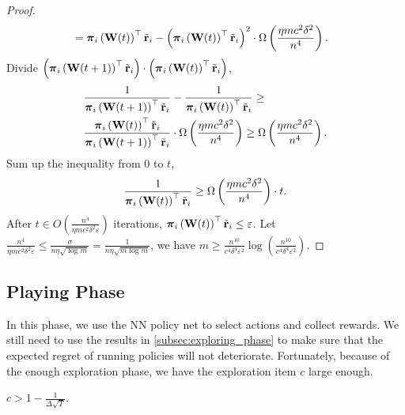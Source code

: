 \begin{proof}
\begin{equation*}
\begin{split}
    &= {\boldsymbol{\pi}}_i\left( {\mathbf{W}}(t) \right)^\top {\tilde{\mathbf{r}}}_i - \left( {\boldsymbol{\pi}}_i\left( {\mathbf{W}}(t) \right)^\top {\tilde{\mathbf{r}}}_i \right)^2 \cdot \Omega\left( \frac{\eta m c^2 \delta^2}{n^4} \right).
\end{split}
\end{equation*}
Divide $\left( {\boldsymbol{\pi}}_i\left( {\mathbf{W}}(t+1) \right)^\top {\tilde{\mathbf{r}}}_i\right) \cdot \left( {\boldsymbol{\pi}}_i\left( {\mathbf{W}}(t) \right)^\top {\tilde{\mathbf{r}}}_i \right)$,
\begin{equation*}
\begin{split}
    &\frac{1}{{\boldsymbol{\pi}}_i\left( {\mathbf{W}}(t+1) \right)^\top {\tilde{\mathbf{r}}}_i} - \frac{1}{{\boldsymbol{\pi}}_i\left( {\mathbf{W}}(t) \right)^\top {\tilde{\mathbf{r}}}_i} \ge \\
    &\frac{{\boldsymbol{\pi}}_i\left( {\mathbf{W}}(t) \right)^\top {\tilde{\mathbf{r}}}_i}{{\boldsymbol{\pi}}_i\left( {\mathbf{W}}(t+1) \right)^\top {\tilde{\mathbf{r}}}_i} \cdot \Omega\left( \frac{\eta m c^2 \delta^2}{n^4} \right) \ge \Omega\left( \frac{\eta m c^2 \delta^2}{n^4} \right).
\end{split}
\end{equation*}
Sum up the inequality from $0$ to $t$,
\begin{equation*}
\begin{split}
    \frac{1}{{\boldsymbol{\pi}}_i\left( {\mathbf{W}}(t) \right)^\top {\tilde{\mathbf{r}}}_i} \ge \Omega\left( \frac{\eta m c^2 \delta^2}{n^4} \right) \cdot t.
\end{split}
\end{equation*}
After $t \in O\left( \frac{n^4}{\eta m c^2 \delta^2 \varepsilon} \right)$ iterations, ${\boldsymbol{\pi}}_i\left( {\mathbf{W}}(t) \right)^\top {\tilde{\mathbf{r}}}_i \le \varepsilon$. Let $\frac{n^4}{\eta m c^2 \delta^2 \varepsilon} \le \frac{\sigma}{n \eta \sqrt{\log{m}}} = \frac{1}{n \eta \sqrt{m \log{m}}}$, we have $m \ge \frac{n^{10}}{c^4 \delta^4 \varepsilon^2}\log{\left( \frac{n^{10}}{c^4 \delta^4 \varepsilon^2} \right)}$.
\end{proof}

\subsection{Playing Phase}
\label{subsec:playing_phase}

In this phase, we use the NN policy net to select actions and collect rewards. We still need to use the  results in \cref{subsec:exploring_phase} to make sure that the expected regret of running policies will not deteriorate. Fortunately, because of the enough exploration phase, we have the exploration item $c$ large enough.

\begin{lem}
    $c > 1 - \frac{1}{\Delta \sqrt{T}}$.
\end{lem}

